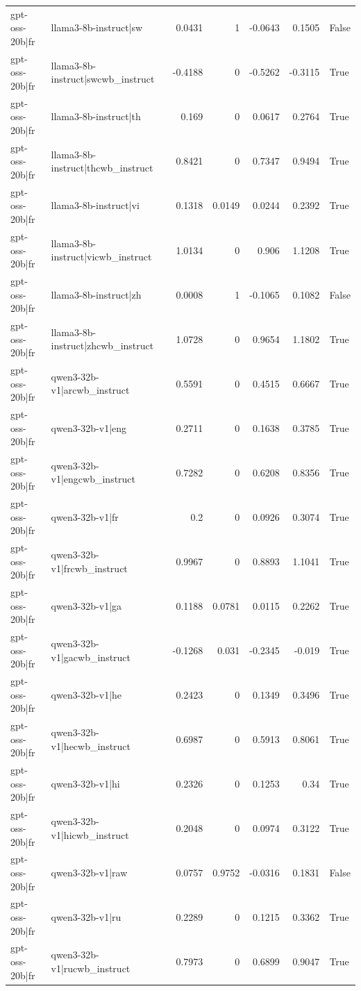\begin{table}
\begin{tabular}{l l r r r r l}
gpt-oss-20b|fr & llama3-8b-instruct|sw & 0.0431 & 1 & -0.0643 & 0.1505 & False \\
gpt-oss-20b|fr & llama3-8b-instruct|swcwb_instruct & -0.4188 & 0 & -0.5262 & -0.3115 & True \\
gpt-oss-20b|fr & llama3-8b-instruct|th & 0.169 & 0 & 0.0617 & 0.2764 & True \\
gpt-oss-20b|fr & llama3-8b-instruct|thcwb_instruct & 0.8421 & 0 & 0.7347 & 0.9494 & True \\
gpt-oss-20b|fr & llama3-8b-instruct|vi & 0.1318 & 0.0149 & 0.0244 & 0.2392 & True \\
gpt-oss-20b|fr & llama3-8b-instruct|vicwb_instruct & 1.0134 & 0 & 0.906 & 1.1208 & True \\
gpt-oss-20b|fr & llama3-8b-instruct|zh & 0.0008 & 1 & -0.1065 & 0.1082 & False \\
gpt-oss-20b|fr & llama3-8b-instruct|zhcwb_instruct & 1.0728 & 0 & 0.9654 & 1.1802 & True \\
gpt-oss-20b|fr & qwen3-32b-v1|arcwb_instruct & 0.5591 & 0 & 0.4515 & 0.6667 & True \\
gpt-oss-20b|fr & qwen3-32b-v1|eng & 0.2711 & 0 & 0.1638 & 0.3785 & True \\
gpt-oss-20b|fr & qwen3-32b-v1|engcwb_instruct & 0.7282 & 0 & 0.6208 & 0.8356 & True \\
gpt-oss-20b|fr & qwen3-32b-v1|fr & 0.2 & 0 & 0.0926 & 0.3074 & True \\
gpt-oss-20b|fr & qwen3-32b-v1|frcwb_instruct & 0.9967 & 0 & 0.8893 & 1.1041 & True \\
gpt-oss-20b|fr & qwen3-32b-v1|ga & 0.1188 & 0.0781 & 0.0115 & 0.2262 & True \\
gpt-oss-20b|fr & qwen3-32b-v1|gacwb_instruct & -0.1268 & 0.031 & -0.2345 & -0.019 & True \\
gpt-oss-20b|fr & qwen3-32b-v1|he & 0.2423 & 0 & 0.1349 & 0.3496 & True \\
gpt-oss-20b|fr & qwen3-32b-v1|hecwb_instruct & 0.6987 & 0 & 0.5913 & 0.8061 & True \\
gpt-oss-20b|fr & qwen3-32b-v1|hi & 0.2326 & 0 & 0.1253 & 0.34 & True \\
gpt-oss-20b|fr & qwen3-32b-v1|hicwb_instruct & 0.2048 & 0 & 0.0974 & 0.3122 & True \\
gpt-oss-20b|fr & qwen3-32b-v1|raw & 0.0757 & 0.9752 & -0.0316 & 0.1831 & False \\
gpt-oss-20b|fr & qwen3-32b-v1|ru & 0.2289 & 0 & 0.1215 & 0.3362 & True \\
gpt-oss-20b|fr & qwen3-32b-v1|rucwb_instruct & 0.7973 & 0 & 0.6899 & 0.9047 & True \\

\end{tabular}
\end{table}
